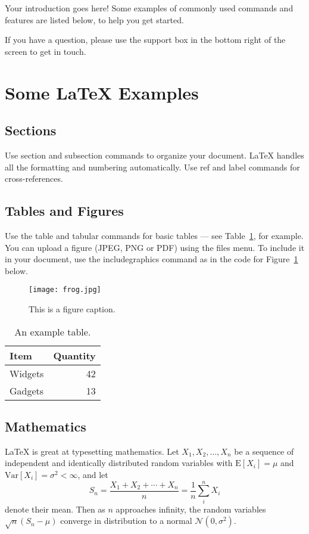Your introduction goes here! Some examples of commonly used commands and features are listed below, to help you get started.

If you have a question, please use the support box in the bottom right of the screen to get in touch. 

\section{Some \LaTeX{} Examples}
\label{sec:examples}

\subsection{Sections}

Use section and subsection commands to organize your document. \LaTeX{} handles all the formatting and numbering automatically. Use ref and label commands for cross-references.

\subsection{Tables and Figures}

Use the table and tabular commands for basic tables --- see Table~\ref{tab:widgets}, for example. You can upload a figure (JPEG, PNG or PDF) using the files menu. To include it in your document, use the includegraphics command as in the code for Figure~\ref{fig:frog} below.

\begin{figure}
\centering
\texttt{[image: frog.jpg]}
\caption{\label{fig:frog}This is a figure caption.}
\end{figure}

\begin{table}
\centering
\begin{tabular}{l|r}
Item & Quantity \\\hline
Widgets & 42 \\
Gadgets & 13
\end{tabular}
\caption{\label{tab:widgets}An example table.}
\end{table}

\subsection{Mathematics}

\LaTeX{} is great at typesetting mathematics. Let $X_1, X_2, \ldots, X_n$ be a sequence of independent and identically distributed random variables with $\text{E}[X_i] = \mu$ and $\text{Var}[X_i] = \sigma^2 < \infty$, and let
$$S_n = \frac{X_1 + X_2 + \cdots + X_n}{n}
      = \frac{1}{n}\sum_{i}^{n} X_i$$
denote their mean. Then as $n$ approaches infinity, the random variables $\sqrt{n}(S_n - \mu)$ converge in distribution to a normal $\mathcal{N}(0, \sigma^2)$.

